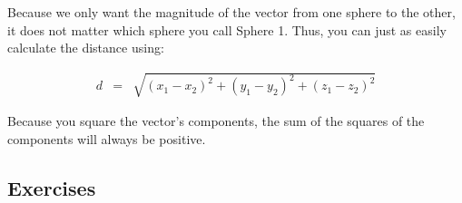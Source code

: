 Because we only want the magnitude of the vector from one sphere to the other, it does not matter which sphere you call Sphere 1. Thus, you can just as easily calculate the distance using:

\begin{eqnarray*}
	d & = & \sqrt{(x_1-x_2)^2 + (y_1-y_2)^2 + (z_1-z_2)^2}
\end{eqnarray*}

Because you square the vector's components, the sum of the squares of the components will always be positive.

\subsection*{Exercises}




\procedure

